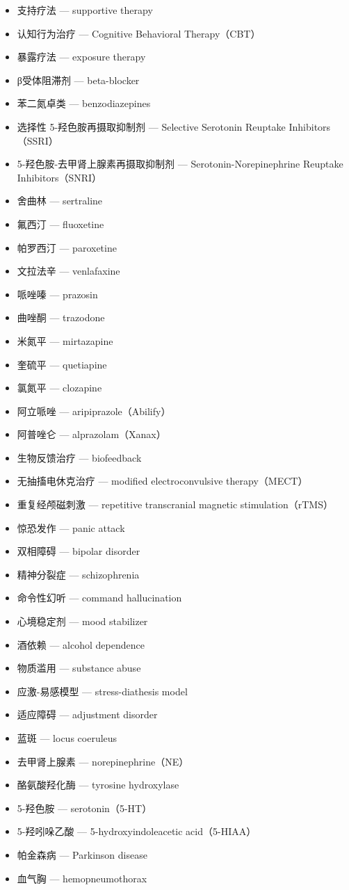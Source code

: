 \documentclass[
  chinese,
  9pt,
  a4paper,
]{ctexart}
\begin{document}
\begin{itemize}
\item
  支持疗法 --- supportive therapy
\item
  认知行为治疗 --- Cognitive Behavioral Therapy（CBT）
\item
  暴露疗法 --- exposure therapy
\item
  β受体阻滞剂 --- beta-blocker
\item
  苯二氮卓类 --- benzodiazepines
\item
  选择性 5-羟色胺再摄取抑制剂 --- Selective Serotonin Reuptake
  Inhibitors（SSRI）
\item
  5-羟色胺-去甲肾上腺素再摄取抑制剂 --- Serotonin-Norepinephrine
  Reuptake Inhibitors（SNRI）
\item
  舍曲林 --- sertraline
\item
  氟西汀 --- fluoxetine
\item
  帕罗西汀 --- paroxetine
\item
  文拉法辛 --- venlafaxine
\item
  哌唑嗪 --- prazosin
\item
  曲唑酮 --- trazodone
\item
  米氮平 --- mirtazapine
\item
  奎硫平 --- quetiapine
\item
  氯氮平 --- clozapine
\item
  阿立哌唑 --- aripiprazole（Abilify）
\item
  阿普唑仑 --- alprazolam（Xanax）
\item
  生物反馈治疗 --- biofeedback
\item
  无抽搐电休克治疗 --- modified electroconvulsive therapy（MECT）
\item
  重复经颅磁刺激 --- repetitive transcranial magnetic
  stimulation（rTMS）
\item
  惊恐发作 --- panic attack
\item
  双相障碍 --- bipolar disorder
\item
  精神分裂症 --- schizophrenia
\item
  命令性幻听 --- command hallucination
\item
  心境稳定剂 --- mood stabilizer
\item
  酒依赖 --- alcohol dependence
\item
  物质滥用 --- substance abuse
\item
  应激-易感模型 --- stress-diathesis model
\item
  适应障碍 --- adjustment disorder
\item
  蓝斑 --- locus coeruleus
\item
  去甲肾上腺素 --- norepinephrine（NE）
\item
  酪氨酸羟化酶 --- tyrosine hydroxylase
\item
  5-羟色胺 --- serotonin（5-HT）
\item
  5-羟吲哚乙酸 --- 5-hydroxyindoleacetic acid（5-HIAA）
\item
  帕金森病 --- Parkinson disease
\item
  血气胸 --- hemopneumothorax
\end{itemize}
\end{document}
